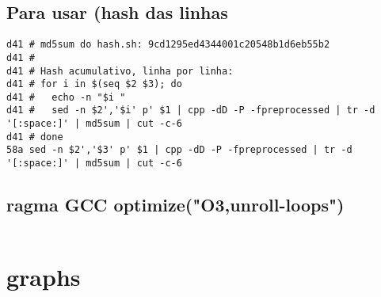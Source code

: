 \documentclass[11pt, a4paper, twoside]{article}
\begin{document}
\subsection{Para usar (hash das linhas}
\begin{lstlisting}
d41 # md5sum do hash.sh: 9cd1295ed4344001c20548b1d6eb55b2
d41 #
d41 # Hash acumulativo, linha por linha:
d41 # for i in $(seq $2 $3); do
d41 #   echo -n "$i "
d41 #   sed -n $2','$i' p' $1 | cpp -dD -P -fpreprocessed | tr -d '[:space:]' | md5sum | cut -c-6
d41 # done
58a sed -n $2','$3' p' $1 | cpp -dD -P -fpreprocessed | tr -d '[:space:]' | md5sum | cut -c-6
\end{lstlisting}

\subsection{ragma GCC optimize("O3,unroll-loops")}
\begin{lstlisting}
\end{lstlisting}



%
%

\section{graphs}
\end{document}
